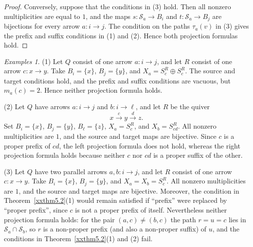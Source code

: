 \documentclass{amsart}
\theoremstyle{definition}
\theoremstyle{remark}
\newtheorem{examples}[theorem]{Examples}
\numberwithin{equation}{section}
\begin{document}
\begin{proof}
Conversely, suppose that the conditions in \textup{(3)} hold.
Then all nonzero multiplicities are equal to $1$, and the maps
$s\colon\mathcal S_a\to B_i$ and
$t\colon\mathcal S_a\to B_j$
are bijections for every arrow $a\colon i\to j$.
The condition on the paths $\tau_a(v)$ in \textup{(3)} gives the prefix and
suffix conditions in \textup{(1)} and \textup{(2)}.
Hence both projection formulas hold.
\end{proof}

\begin{examples}\label{xxexample5.3}
\textup{(1)} Let $Q$ consist of one arrow $a\colon i\to j$, and let $R$ consist
of one arrow $c\colon x\to y$. Take $B_i=\{x\}$, $B_j=\{y\}$, and
$X_a=S_c^R\oplus S_c^R$.
The source and target conditions hold, and the prefix and suffix conditions
are vacuous, but $m_a(c)=2$. Hence neither projection formula holds.

\textup{(2)} Let $Q$ have arrows
$a\colon i\to j$ and $b\colon i\to\ell$, and let
$R$ be the quiver
\[
x\xrightarrow{\,c\,}y\xrightarrow{\,d\,}z.
\]
Set $B_i=\{x\}$, $B_j=\{y\}$, $B_\ell=\{z\}$,
$X_a=S_c^R$, and $X_b=S_{cd}^R$.
All nonzero multiplicities are $1$, and the source and target maps are
bijective.
Since $c$ is a proper prefix of $cd$, the left projection formula does not
hold, whereas the right projection formula holds because neither $c$ nor
$cd$ is a proper suffix of the other.

\textup{(3)} Let $Q$ have two parallel arrows $a,b\colon i\to j$, and let
$R$ consist of one arrow $c\colon x\to y$. Take $B_i=\{x\}$,
$B_j=\{y\}$, and $X_a=X_b=S_c^R$.
All nonzero multiplicities are $1$, and the source and target maps are
bijective. Moreover, the condition in
Theorem~\ref{xxthm5.2}\textup{(1)} would
remain satisfied
if ``prefix'' were replaced by ``proper prefix'', since $c$ is not a
proper prefix of itself. Nevertheless neither projection formula holds:
for the pair $(a,c)\neq(b,c)$ the path $r=u=c$ lies in
$\mathcal S_a\cap\mathcal S_b$, so $r$ is a non-proper prefix (and also a
non-proper suffix) of $u$, and the conditions in
Theorem~\ref{xxthm5.2}\textup{(1)} and
\textup{(2)} fail.
\end{examples}
\end{document}
